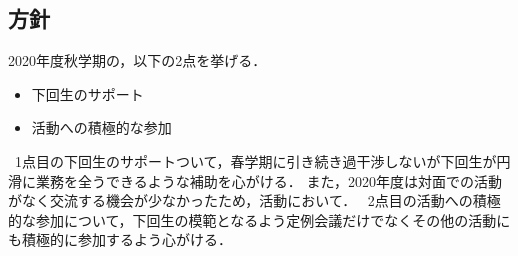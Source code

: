 \subsection*{\newGradeIfKouki{}\thirdGrade{}方針}


2020年度秋学期の，以下の2点を挙げる．
\begin{itemize}
  \item 下回生のサポート
  \item 活動への積極的な参加
\end{itemize}
\ 1点目の下回生のサポートついて，春学期に引き続き過干渉しないが下回生が円滑に業務を全うできるような補助を心がける．
また，2020年度は対面での活動がなく交流する機会が少なかったため，活動において．
\ 2点目の活動への積極的な参加について，下回生の模範となるよう定例会議だけでなくその他の活動にも積極的に参加するよう心がける．

